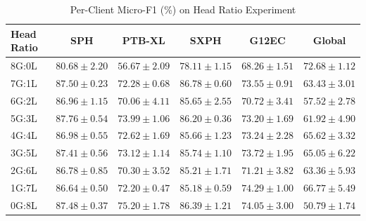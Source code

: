 \documentclass[a4paper]{article}
\begin{document}
\begin{table}[htbp]
  \centering
  \caption{Per-Client Micro-F1 (\%) on Head Ratio Experiment}
  \begin{tabular}{l|cccc|c}
    \toprule
    Head Ratio & SPH & PTB-XL & SXPH & G12EC & Global \\
    \midrule
    8G:0L & $80.68 \pm 2.20$ & $56.67 \pm 2.09$ & $78.11 \pm 1.15$ & $68.26 \pm 1.51$ & \textbf{$72.68 \pm 1.12$} \\
    7G:1L & $87.50 \pm 0.23$ & $72.28 \pm 0.68$ & \textbf{$86.78 \pm 0.60$} & $73.55 \pm 0.91$ & $63.43 \pm 3.01$ \\
    6G:2L & $86.96 \pm 1.15$ & $70.06 \pm 4.11$ & $85.65 \pm 2.55$ & $70.72 \pm 3.41$ & $57.52 \pm 2.78$ \\
    5G:3L & \textbf{$87.76 \pm 0.54$} & $73.99 \pm 1.06$ & $86.20 \pm 0.36$ & $73.20 \pm 1.69$ & $61.92 \pm 4.90$ \\
    4G:4L & $86.98 \pm 0.55$ & $72.62 \pm 1.69$ & $85.66 \pm 1.23$ & $73.24 \pm 2.28$ & $65.62 \pm 3.32$ \\
    3G:5L & $87.41 \pm 0.56$ & $73.12 \pm 1.14$ & $85.74 \pm 1.10$ & $73.72 \pm 1.95$ & $65.05 \pm 6.22$ \\
    2G:6L & $86.78 \pm 0.85$ & $70.30 \pm 3.52$ & $85.21 \pm 1.71$ & $71.21 \pm 3.82$ & $63.36 \pm 5.93$ \\
    1G:7L & $86.64 \pm 0.50$ & $72.20 \pm 0.47$ & $85.18 \pm 0.59$ & \textbf{$74.29 \pm 1.00$} & $66.77 \pm 5.49$ \\
    0G:8L & $87.48 \pm 0.37$ & \textbf{$75.20 \pm 1.78$} & $86.39 \pm 1.21$ & $74.05 \pm 3.00$ & $50.79 \pm 1.74$ \\
    \bottomrule
  \end{tabular}
\end{table}
\clearpage
\end{document}
